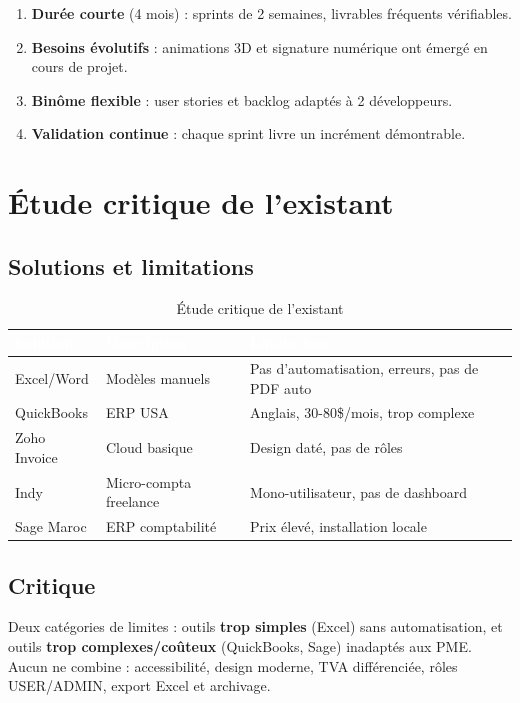 \begin{enumerate}
    \item \textbf{Durée courte} (4 mois) : sprints de 2 semaines, livrables fréquents vérifiables.
    \item \textbf{Besoins évolutifs} : animations 3D et signature numérique ont émergé en cours de projet.
    \item \textbf{Binôme flexible} : user stories et backlog adaptés à 2 développeurs.
    \item \textbf{Validation continue} : chaque sprint livre un incrément démontrable.
\end{enumerate}

\section{Étude critique de l'existant}

\subsection{Solutions et limitations}

\begin{table}[H]
\centering
\caption{Étude critique de l'existant}
\label{tab:existant}
\begin{tabularx}{\textwidth}{|l|X|X|}
\hline
\rowcolor{emsiblue}\textcolor{white}{\textbf{Solution}} & \textcolor{white}{\textbf{Description}} & \textcolor{white}{\textbf{Limitations}} \\
\hline
Excel/Word & Modèles manuels & Pas d'automatisation, erreurs, pas de PDF auto \\
QuickBooks & ERP USA & Anglais, 30-80\$/mois, trop complexe \\
Zoho Invoice & Cloud basique & Design daté, pas de rôles \\
Indy & Micro-compta freelance & Mono-utilisateur, pas de dashboard \\
Sage Maroc & ERP comptabilité & Prix élevé, installation locale \\
\hline
\end{tabularx}
\end{table}

\subsection{Critique}

Deux catégories de limites : outils \textbf{trop simples} (Excel) sans automatisation, et outils \textbf{trop complexes/coûteux} (QuickBooks, Sage) inadaptés aux PME. Aucun ne combine : accessibilité, design moderne, TVA différenciée, rôles USER/ADMIN, export Excel et archivage.

